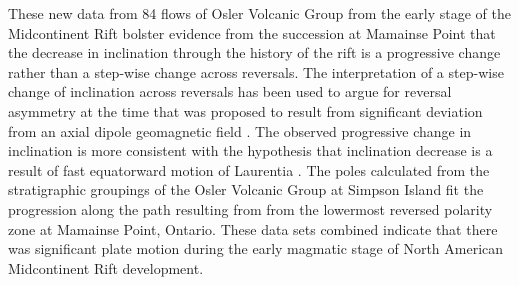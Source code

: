 \documentclass[draft,gc]{AGUTeX}
\begin{document}
\begin{article}
These new data from 84 flows of Osler Volcanic Group from the early stage of the Midcontinent Rift bolster evidence from the succession at Mamainse Point that the decrease in inclination through the history of the rift is a progressive change rather than a step-wise change across reversals. The interpretation of a step-wise change of inclination across reversals has been used to argue for reversal asymmetry at the time that was proposed to result from significant deviation from an axial dipole geomagnetic field \citep{Pesonen1981a}. The observed progressive change in inclination is more consistent with the hypothesis that inclination decrease is a result of fast equatorward motion of Laurentia \citep{Davis1997a, Swanson-Hysell2009a}. The poles calculated from the stratigraphic groupings of the Osler Volcanic Group at Simpson Island fit the progression along the path resulting from from the lowermost reversed polarity zone at Mamainse Point, Ontario. These data sets combined indicate that there was significant plate motion during the early magmatic stage of North American Midcontinent Rift development. 


\end{article}
\end{document}
